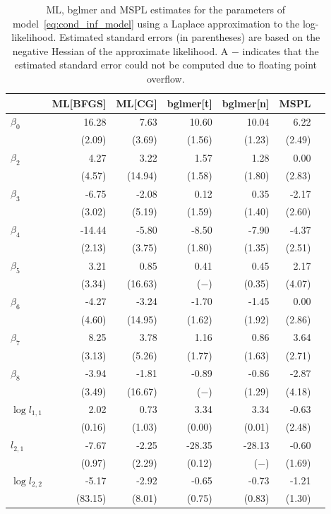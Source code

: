 \documentclass[11pt, a4paper]{article}
\theoremstyle{example} \newtheorem{example}{Example}[section]
\theoremstyle{theorem} \newtheorem{theorem}{Theorem}[section]
\begin{document}
\begin{table}[t]
  \centering
 \caption{ML, bglmer and MSPL estimates for the parameters of model~\eqref{eq:cond_inf_model} using a Laplace approximation to the log-likelihood. Estimated standard errors (in parentheses) are based on the negative Hessian of the approximate likelihood. A $-$ indicates that the estimated standard error could not be computed due to floating point overflow.}
 \label{tab:cond_inf}
  \centering
  \begin{tabular}{lrrrrrr}
    \toprule
    &
      \multicolumn{1}{c}{ML[BFGS]} & 
			\multicolumn{1}{c}{ML[CG]} &
			\multicolumn{1}{c}{bglmer[t]} &
			\multicolumn{1}{c}{bglmer[n]} & 
			\multicolumn{1}{c}{MSPL} \\
			\midrule
			$\beta_0$ & 16.28 & 7.63 & 10.60 & 10.04 & 6.22 \\ 
			& (2.09) & (3.69) & (1.56) & (1.23) & (2.49) \\ 
			$\beta_2$ & 4.27 & 3.22 & 1.57 & 1.28 & 0.00 \\ 
			& (4.57) & (14.94) & (1.58) & (1.80) & (2.83) \\ 
			$\beta_3$ & -6.75 & -2.08 & 0.12 & 0.35 & -2.17 \\ 
			& (3.02) & (5.19) & (1.59) & (1.40) & (2.60) \\ 
			$\beta_4$ & -14.44 & -5.80 & -8.50 & -7.90 & -4.37 \\ 
			& (2.13) & (3.75) & (1.80) & (1.35) & (2.51) \\ 
			$\beta_5$ & 3.21 & 0.85 & 0.41 & 0.45 & 2.17 \\ 
			& (3.34) & (16.63) & ($-$) & (0.35) & (4.07) \\ 
			$\beta_6$ & -4.27 & -3.24 & -1.70 & -1.45 & 0.00 \\ 
			& (4.60) & (14.95) & (1.62) & (1.92) & (2.86) \\ 
			$\beta_7$ & 8.25 & 3.78 & 1.16 & 0.86 & 3.64 \\ 
			& (3.13) & (5.26) & (1.77) & (1.63) & (2.71) \\ 
			$\beta_8$ & -3.94 & -1.81 & -0.89 & -0.86 & -2.87 \\ 
			& (3.49) & (16.67) & ($-$) & (1.29) & (4.18) \\ 
			$\log l_{1,1}$ & 2.02 & 0.73 & 3.34 & 3.34 & -0.63 \\ 
			& (0.16) & (1.03) & (0.00) & (0.01) & (2.48) \\ 
			$l_{2,1}$ & -7.67 & -2.25 & -28.35 & -28.13 & -0.60 \\ 
			& (0.97) & (2.29) & (0.12) & ($-$) & (1.69) \\ 
			$\log l_{2,2}$ & -5.17 & -2.92 & -0.65 & -0.73 & -1.21 \\ 
			& (83.15) & (8.01) & (0.75) & (0.83) & (1.30) \\ 
			\bottomrule
  \end{tabular}
\end{table}
\end{document}
